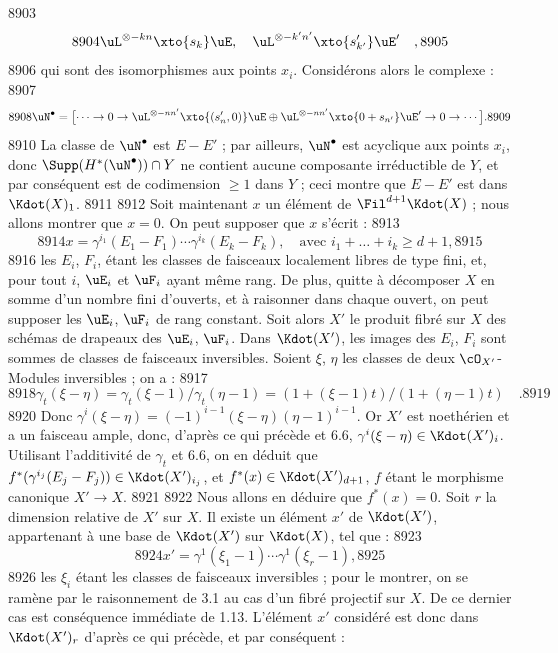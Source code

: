   8903	\[
  8904	\uL^{\otimes -kn} \xto{s_k} \uE, \quad \uL^{\otimes -k'n'} \xto{s'_{k'}} \uE' \quad ,
  8905	\]
  8906	qui sont des isomorphismes aux points $x_i$. Consid\'erons alors le complexe :
  8907	\[
  8908	\uN^{\bullet} = \bigl[ \cdots \to 0 \to \uL^{\otimes -nn'} \xto{(s'_n,0)} \uE \oplus \uL^{\otimes -nn'} \xto{0 + s_{n'}} \uE' \to 0 \to \cdots \bigr].
  8909	\]
  8910	La classe de $\uN^{\bullet}$ est $E - E'$ ; par ailleurs, $\uN^{\bullet}$ est acyclique aux points $x_i$, donc $\Supp(H^{*}(\uN^{\bullet})) \cap Y$ ne contient aucune composante irr\'eductible de $Y$, et par cons\'equent est de codimension $\geq 1$ dans $Y$ ; ceci montre que $E - E'$ est dans $\Kdot(X)_1$.
  8911	
  8912	Soit maintenant $x$ un \'el\'ement de $\Fil^{d+1} \Kdot(X)$ ; nous allons montrer que $x = 0$. On peut supposer que $x$ s'\'ecrit :
  8913	\[
  8914	x = \gamma^{i_1}(E_1 - F_1) \cdots \gamma^{i_k}(E_k - F_k), \quad \text{avec } i_1 + \dots + i_k \geq d+1,
  8915	\]
  8916	les $E_i$, $F_i$, \'etant les classes de faisceaux localement libres de type fini, et, pour tout $i$, $\uE_i$ et $\uF_i$ ayant m\^eme rang. De plus, quitte \`a d\'ecomposer $X$ en somme d'un nombre fini d'ouverts, et \`a raisonner dans chaque ouvert, on peut supposer les $\uE_i$, $\uF_i$ de rang constant. Soit alors $X'$ le produit fibr\'e sur $X$ des sch\'emas de drapeaux des $\uE_i$, $\uF_i$. Dans $\Kdot(X')$, les images des $E_i$, $F_i$ sont sommes de classes de faisceaux inversibles. Soient $\xi$, $\eta$ les classes de deux $\cO_{X'}$-Modules inversibles ; on a :
  8917	\[
  8918	\gamma_t(\xi - \eta) = \gamma_t(\xi - 1)/\gamma_t(\eta - 1) = (1 + (\xi - 1)t)/(1 + (\eta - 1)t) \quad .
  8919	\]
  8920	Donc $\gamma^i(\xi - \eta) = (-1)^{i-1}(\xi - \eta)(\eta - 1)^{i-1}$. Or $X'$ est noeth\'erien et a un faisceau ample, donc, d'apr\`es ce qui pr\'ec\`ede et 6.6, $\gamma^i(\xi - \eta) \in \Kdot(X')_i$. Utilisant l'additivit\'e de $\gamma_t$ et 6.6, on en d\'eduit que $f^{*}(\gamma^{i_j}(E_j - F_j)) \in \Kdot(X')_{i_j}$, et $f^{*}(x) \in \Kdot(X')_{d+1}$, $f$ \'etant le morphisme canonique $X' \to X$.
  8921	
  8922	Nous allons en d\'eduire que $f^{*}(x) = 0$. Soit $r$ la dimension relative de $X'$ sur $X$. Il existe un \'el\'ement $x'$ de $\Kdot(X')$, appartenant \`a une base de $\Kdot(X')$ sur $\Kdot(X)$, tel que :
  8923	\[
  8924	x' = \gamma^1(\xi_1 - 1) \cdots \gamma^1(\xi_r - 1),
  8925	\]
  8926	les $\xi_i$ \'etant les classes de faisceaux inversibles ; pour le montrer, on se ram\`ene par le raisonnement de 3.1 au cas d'un fibr\'e projectif sur $X$. De ce dernier cas est cons\'equence imm\'ediate de 1.13. L'\'el\'ement $x'$ consid\'er\'e est donc dans $\Kdot(X')_r$ d'apr\`es ce qui pr\'ec\`ede, et par cons\'equent :
